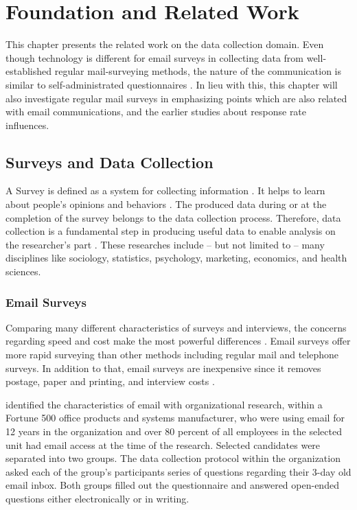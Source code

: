 \chapter{Foundation and Related Work}
\label{chp:FouRelWor}
This chapter presents the related work on the data collection domain. Even though technology is different for email surveys in collecting data from well-established regular mail-surveying methods, the nature of the communication is similar to self-administrated questionnaires \citep{Schaefer1998}. In lieu with this, this chapter will also investigate regular mail surveys in emphasizing points which are also related with email communications, and the earlier studies about response rate influences.

\section{Surveys and Data Collection}
\label{sec:1:SurDatCol}
A Survey is defined as a system for collecting information \citep[page 3]{Sue2011}. It helps to learn about people's opinions and behaviors \citep{DillmanDonA.SmythJoleneD.Christian2009}. The produced data during or at the completion of the survey belongs to the data collection process. Therefore, data collection is a fundamental step in producing useful data to enable analysis on the researcher's part \citep[page 149]{Groves2009}. These researches include -- but not limited to -- many disciplines like sociology, statistics, psychology, marketing, economics, and health sciences. 

\subsection{Email Surveys}
\label{sec:2.1.1:EmaSur}

Comparing many different characteristics of surveys and interviews, the concerns regarding speed and cost make the most powerful differences \citep{Sproull1986, Schaefer1998}. Email surveys offer more rapid surveying than other methods including regular mail and telephone surveys. In addition to that, email surveys are inexpensive since it removes postage, paper and printing, and interview costs \citep{Schaefer1998}.
\vspace{1cm}

\cite{Sproull1986} identified the characteristics of email with organizational research, within a Fortune 500 office products and systems manufacturer, who were using email for 12 years in the organization and over 80 percent of all employees in the selected unit had email access at the time of the research. Selected candidates were separated into two groups. The data collection protocol within the organization asked each of the group's participants series of questions regarding their 3-day old email inbox. Both groups filled out the questionnaire and answered open-ended questions either electronically or in writing.
\vspace{1cm}

